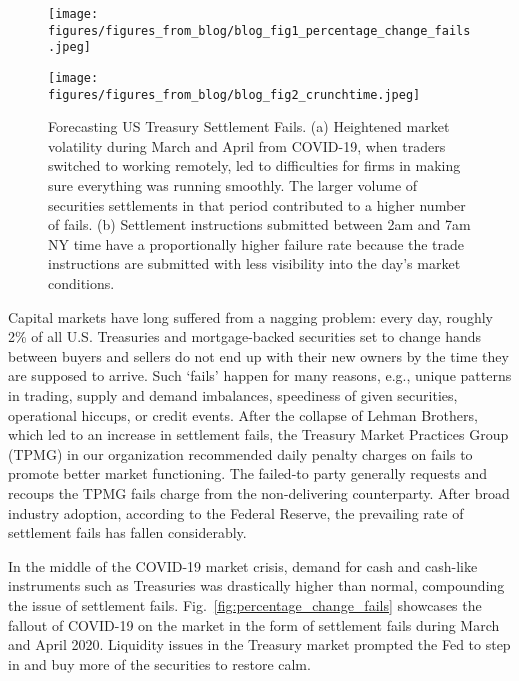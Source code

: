 
\begin{figure*}
\begin{minipage}{0.4\textwidth}
\texttt{[image: figures/figures\_from\_blog/blog\_fig1\_percentage\_change\_fails.jpeg]}
\subcaption{}
\label{fig:percentage_change_fails}
\end{minipage}
\hfill
\begin{minipage}{0.45\textwidth}
\texttt{[image: figures/figures\_from\_blog/blog\_fig2\_crunchtime.jpeg]}
\vspace{1.3em}
\subcaption{}
\label{fig:crunchtime}
\end{minipage}
\caption{Forecasting US Treasury Settlement Fails. (a) Heightened market volatility during March and April from COVID-19, when traders switched to working remotely, led to difficulties for firms in making sure everything was running smoothly. The larger volume of securities settlements in that period contributed to a higher number of fails. (b) Settlement instructions submitted between 2am and 7am NY time have a proportionally higher failure rate because the trade instructions are submitted with less visibility into the day’s market conditions. }
\label{fig:blog_fig1_fig2}
\end{figure*}

Capital markets have long suffered from a nagging problem: every day, roughly 2\% of all U.S. Treasuries and mortgage-backed securities set to change hands between buyers and sellers do not end up with their new owners by the time they are supposed to arrive.
Such `fails' happen for
many reasons, e.g.,
unique patterns in trading,
supply and demand imbalances,
speediness of given
securities, operational
hiccups, or credit events.
After the collapse
of Lehman Brothers, which led to an increase in settlement fails, the
Treasury Market Practices Group (TPMG) in our organization recommended daily
penalty charges on fails
to promote better market
functioning. 
The failed-to party
generally requests and
recoups the TPMG fails
charge from the non-delivering counterparty. After broad
industry adoption, according to the Federal
Reserve, the prevailing rate of settlement fails has fallen considerably.


In the middle of the COVID-19 market crisis, demand for cash and cash-like instruments such as Treasuries was drastically higher than normal, compounding the issue of settlement fails. Fig.~\ref{fig:percentage_change_fails} showcases the fallout of COVID-19 on the market in the form of settlement fails during March and April 2020. Liquidity issues in the Treasury market prompted the Fed to step in and buy more of the securities to restore calm.

